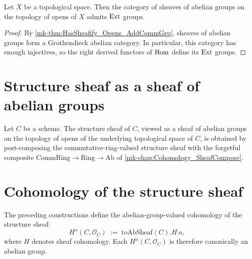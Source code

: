 \begin{theorem}\label{mk-thm:HasExt_Sheaf_Opens_AddCommGrp}
  \leanok


  Let \(X\) be a topological space. Then the category of sheaves of abelian groups on the topology of opens of \(X\) admits \(\operatorname{Ext}\) groups.
\end{theorem}

\begin{proof}
  \leanok


By \ref{mk-thm:HasSheafify_Opens_AddCommGrp}, sheaves of abelian groups form a Grothendieck abelian category. In particular, this category has enough injectives, so the right derived functors of \(\operatorname{Hom}\) define its \(\operatorname{Ext}\) groups.
\end{proof}

\section{Structure sheaf as a sheaf of abelian groups}

\begin{definition}\label{mk-def:Scheme_toAbSheaf}
  \leanok


  Let \(C\) be a scheme. The structure sheaf of \(C\), viewed as a sheaf of abelian groups on the topology of opens of the underlying topological space of \(C\), is obtained by post-composing the commutative-ring-valued structure sheaf with the forgetful composite \(\mathrm{CommRing} \to \mathrm{Ring} \to \mathrm{Ab}\) of \ref{mk-chap:Cohomology_SheafCompose}.
\end{definition}

\section{Cohomology of the structure sheaf}

The preceding constructions define the abelian-group-valued cohomology of the structure sheaf:
\[
  H^n(C, \mathcal O_C) \;:=\; \text{toAbSheaf}(C).H\,n,
\]
where \(H\) denotes sheaf cohomology. Each \(H^n(C, \mathcal O_C)\) is therefore canonically an abelian group.
